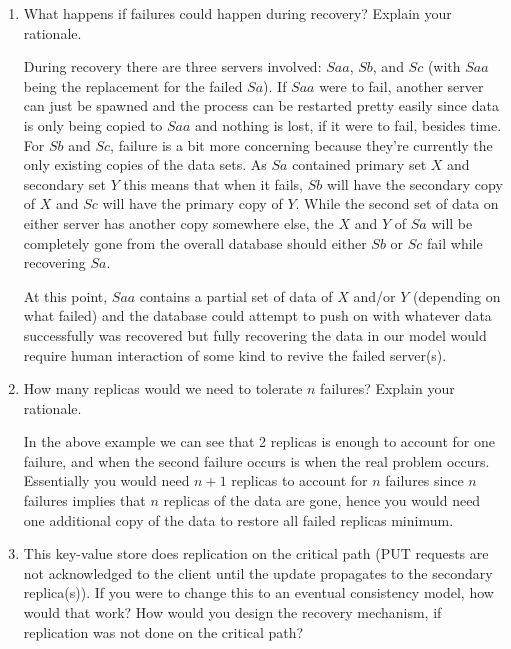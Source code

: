\documentclass[11pt,twoside]{article}
\begin{document}
\begin{enumerate}
    
    \item What happens if failures could happen during recovery? Explain your rationale.
    
    During recovery there are three servers involved: $Saa$, $Sb$, and $Sc$ (with $Saa$ being the replacement for the failed $Sa$). If $Saa$ were to fail, another server can just be spawned and the process can be restarted pretty easily since data is only being copied to $Saa$ and nothing is lost, if it were to fail, besides time. For $Sb$ and $Sc$, failure is a bit more concerning because they're currently the only existing copies of the data sets. As $Sa$ contained primary set $X$ and secondary set $Y$ this means that when it fails, $Sb$ will have the secondary copy of $X$ and $Sc$ will have the primary copy of $Y$. While the second set of data on either server has another copy somewhere else, the $X$ and $Y$ of $Sa$ will be completely gone from the overall database should either $Sb$ or $Sc$ fail while recovering $Sa$.
    
    At this point, $Saa$ contains a partial set of data of $X$ and/or $Y$ (depending on what failed) and the database could attempt to push on with whatever data successfully was recovered but fully recovering the data in our model would require human interaction of some kind to revive the failed server(s).
    
    
    \item How many replicas would we need to tolerate $n$ failures? Explain your rationale.
    
    In the above example we can see that 2 replicas is enough to account for one failure, and when the second failure occurs is when the real problem occurs. Essentially you would need $n+1$ replicas to account for $n$ failures since $n$ failures implies that $n$ replicas of the data are gone, hence you would need one additional copy of the data to restore all failed replicas minimum.
    
    
    \item This key-value store does replication on the critical path (PUT requests are not acknowledged to the client until the update propagates to the secondary replica(s)). If you were to change this to an eventual consistency model, how would that work? How would you design the recovery mechanism, if replication was not done on the critical path?
    

\end{enumerate}
\end{document}

